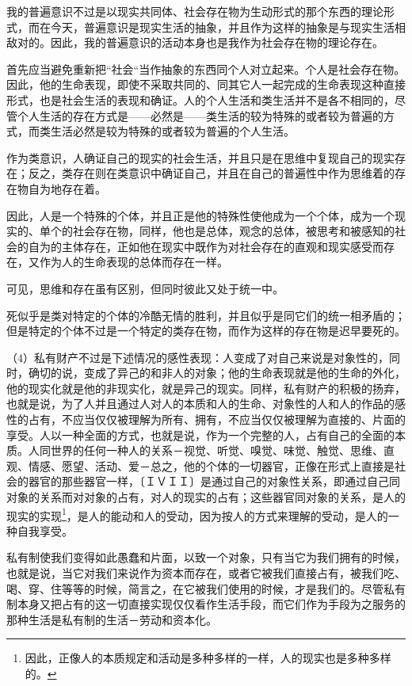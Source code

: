 \documentclass[a4paper,twoside,12pt,AutoFakeBold]{ctexart}
\begin{document}
我的普遍意识不过是以现实共同体、社会存在物为生动形式的那个东西的理论形式，而在今天，普遍意识是现实生活的抽象，并且作为这样的抽象是与现实生活相敌对的。因此，我的普遍意识的活动本身也是我作为社会存在物的理论存在。

首先应当避免重新把“社会“当作抽象的东西同个人对立起来。个人是社会存在物。因此，他的生命表现，即使不采取共同的、同其它人一起完成的生命表现这种直接形式，也是社会生活的表现和确证。人的个人生活和类生活并不是各不相同的，尽管个人生活的存在方式是——必然是——类生活的较为特殊的或者较为普遍的方式，而类生活必然是较为特殊的或者较为普遍的个人生活。

作为类意识，人确证自己的现实的社会生活，并且只是在思维中复现自己的现实存在；反之，类存在则在类意识中确证自己，并且在自己的普遍性中作为思维着的存在物自为地存在着。

因此，人是一个特殊的个体，并且正是他的特殊性使他成为一个个体，成为一个现实的、单个的社会存在物，同样，他也是总体，观念的总体，被思考和被感知的社会的自为的主体存在，正如他在现实中既作为对社会存在的直观和现实感受而存在，又作为人的生命表现的总体而存在一样。

可见，思维和存在虽有区别，但同时彼此又处于统一中。

死似乎是类对特定的个体的冷酷无情的胜利，并且似乎是同它们的统一相矛盾的；但是特定的个体不过是一个特定的类存在物，而作为这样的存在物是迟早要死的。

（4）私有财产不过是下述情况的感性表现：人变成了对自己来说是对象性的，同时，确切的说，变成了异己的和非人的对象；他的生命表现就是他的生命的外化，他的现实化就是他的非现实化，就是异己的现实。同样，私有财产的积极的扬弃，也就是说，为了人并且通过人对人的本质和人的生命、对象性的人和人的作品的感性的占有，不应当仅仅被理解为所有、拥有，不应当仅仅被理解为直接的、片面的享受。人以一种全面的方式，也就是说，作为一个完整的人，占有自己的全面的本质。人同世界的任何一种人的关系－视觉、听觉、嗅觉、味觉、触觉、思维、直观、情感、愿望、活动、爱－总之，他的个体的一切器官，正像在形式上直接是社会的器官的那些器官一样，〔ＩＶＩＩ〕是通过自己的对象性关系，即通过自己同对象的关系而对对象的占有，对人的现实的占有；这些器官同对象的关系，是人的现实的实现\footnote{因此，正像人的本质规定和活动是多种多样的一样，人的现实也是多种多样的。}，是人的能动和人的受动，因为按人的方式来理解的受动，是人的一种自我享受。

私有制使我们变得如此愚蠢和片面，以致一个对象，只有当它为我们拥有的时候，也就是说，当它对我们来说作为资本而存在，或者它被我们直接占有，被我们吃、喝、穿、住等等的时候，简言之，在它被我们使用的时候，才是我们的。尽管私有制本身又把占有的这一切直接实现仅仅看作生活手段，而它们作为手段为之服务的那种生活是私有制的生活－劳动和资本化。
\end{document}

